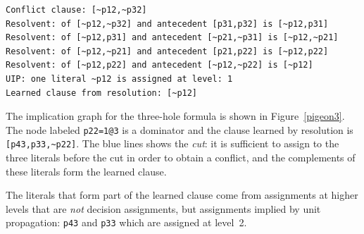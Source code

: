 \documentclass[11pt]{report}
\begin{document}
\newpage

\begin{verbatim}
Conflict clause: [~p12,~p32]
Resolvent: of [~p12,~p32] and antecedent [p31,p32] is [~p12,p31]
Resolvent: of [~p12,p31] and antecedent [~p21,~p31] is [~p12,~p21]
Resolvent: of [~p12,~p21] and antecedent [p21,p22] is [~p12,p22]
Resolvent: of [~p12,p22] and antecedent [~p12,~p22] is [~p12]
UIP: one literal ~p12 is assigned at level: 1
Learned clause from resolution: [~p12]
\end{verbatim}

The implication graph for the three-hole formula is shown in
Figure~\ref{pigeon3}. The node labeled \verb+p22=1@3+ is a dominator and
the clause learned by resolution is \verb+[p43,p33,~p22]+. The blue
lines shows the \emph{cut}: it is sufficient to assign to the three
literals before the cut in order to obtain a conflict, and the
complements of these literals form the learned clause.

The literals that form part of the learned clause come from assignments
at higher levels that are \emph{not} decision assignments, but
assignments implied by unit propagation: \verb+p43+ and \verb+p33+ which
are assigned at level~2.
\end{document}
